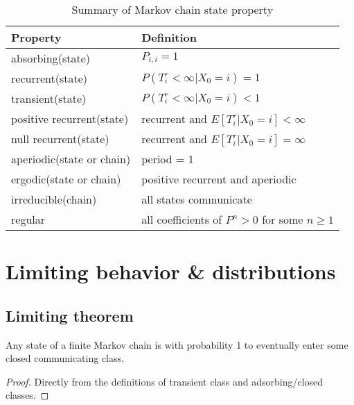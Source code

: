 \begin{refsection}
\begin{table}[H]
	\centering
	\caption{Summary of Markov chain state property\cite[140]{privault2013understanding}}
	\label{ch:markov-chains:table:summaryofmarkovchain}
	\begin{tabular}{|l|l|}
		\hline
		\textbf{Property}         & \textbf{Definition}                              \\ \hline
		absorbing(state)          & $P_{i,i}=1$                                      \\ \hline
		recurrent(state)          & $P(T_i^r < \infty|X_0=i)=1$                      \\ \hline
		transient(state)          & $P(T_i^r < \infty|X_0=i)<1$                      \\ \hline
		positive recurrent(state) & recurrent and $E[T_i^r|X_0=i]<\infty$            \\ \hline
		null recurrent(state)     & recurrent and $E[T_i^r|X_0=i]=\infty$            \\ \hline
		aperiodic(state or chain) & period = 1                                       \\ \hline
		ergodic(state or chain)   & positive recurrent and aperiodic                 \\ \hline
		irreducible(chain)        & all states communicate                           \\ \hline
		regular                   & all coefficients of $P^n > 0$ for some $n\geq 1$ \\ \hline
	\end{tabular}
\end{table}



\section{Limiting behavior \& distributions}
\subsection{Limiting theorem}
\begin{theorem}
\cite[238]{luenberger1979introduction} Any state of a finite Markov chain is with probability 1 to eventually enter some closed communicating class.
\end{theorem}
\begin{proof}
Directly from the definitions of transient class and adsorbing/closed classes.
\end{proof}


\end{refsection}
